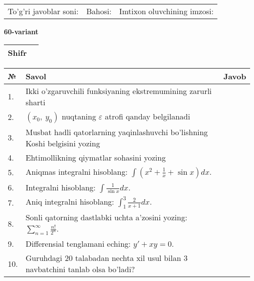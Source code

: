 \documentclass{article}
\begin{document}
  \vspace{1cm}
  
  \begin{tabular}{lll}
  To'g'ri javoblar soni: \underline{\hspace{1.5cm}} & 
  Bahosi: \underline{\hspace{1.5cm}} & 
  Imtixon oluvchining imzosi: \underline{\hspace{2cm}} \\
  \end{tabular}
  
  \egroup
  
  \newpage
  
  
  \textbf{60-variant}\\
  
  \bgroup
  \def\arraystretch{1.6} %
  
  \begin{tabular}{|m{5.7cm}|m{9.5cm}|}
  \hline
  Shifr & \\
  \hline
  \end{tabular}
  
  \vspace{1cm}
  
  \begin{tabular}{|m{0.7cm}|m{10cm}|m{4cm}|}
  \hline
  № & Savol & Javob \\
  \hline
  1. & Ikki o'zgaruvchili funksiyaning ekstremumining zarurli sharti &  \\
  \hline
  2. & \((x_{0},\ y_{0})\) nuqtaning \(\varepsilon\) atrofi qanday belgilanadi &  \\
  \hline
  3. & Musbat hadli qatorlarning yaqinlashuvchi bo'lishning Koshi belgisini yozing &  \\
  \hline
  4. & Ehtimollikning qiymatlar sohasini yozing &  \\
  \hline
  5. & Aniqmas integralni hisoblang: \(\int {\left( x^{2} + \frac{1}{x} + \sin x \right)dx}\). &  \\
  \hline
  6. & Integralni hisoblang: \(\int {\frac{1}{\sin x}dx}\). &  \\
  \hline
  7. & Aniq integralni hisoblang: \(\int_{1}^{3}\frac{2}{x + 1}dx\). &  \\
  \hline
  8. & Sonli qatorning dastlabki uchta a'zosini yozing: \(\sum_{n = 1}^{\infty}\frac{n!}{2^{n}}\). &  \\
  \hline
  9. & Differensial tenglamani eching: \(y' + xy = 0\). &  \\
  \hline
  10. & Guruhdagi 20 talabadan nechta xil usul bilan 3 navbatchini tanlab olsa bo'ladi? &  \\
  \hline
  \end{tabular}
  
\end{document}
